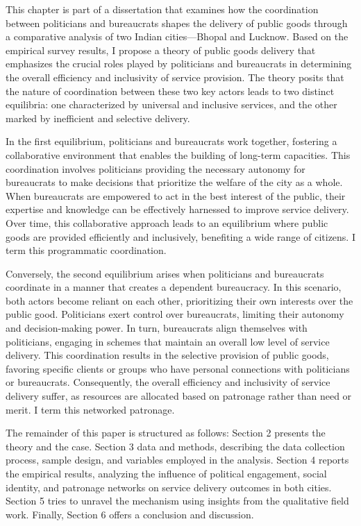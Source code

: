 This chapter is part of a dissertation that examines how the coordination between politicians and bureaucrats shapes the delivery of public goods through a comparative analysis of two Indian cities—Bhopal and Lucknow. Based on the empirical survey results, I propose a theory of public goods delivery that emphasizes the crucial roles played by politicians and bureaucrats in determining the overall efficiency and inclusivity of service provision. The theory posits that the nature of coordination between these two key actors leads to two distinct equilibria: one characterized by universal and inclusive services, and the other marked by inefficient and selective delivery.

In the first equilibrium, politicians and bureaucrats work together, fostering a collaborative environment that enables the building of long-term capacities. This coordination involves politicians providing the necessary autonomy for bureaucrats to make decisions that prioritize the welfare of the city as a whole. When bureaucrats are empowered to act in the best interest of the public, their expertise and knowledge can be effectively harnessed to improve service delivery. Over time, this collaborative approach leads to an equilibrium where public goods are provided efficiently and inclusively, benefiting a wide range of citizens. I term this programmatic coordination. 

Conversely, the second equilibrium arises when politicians and bureaucrats coordinate in a manner that creates a dependent bureaucracy. In this scenario, both actors become reliant on each other, prioritizing their own interests over the public good. Politicians exert control over bureaucrats, limiting their autonomy and decision-making power. In turn, bureaucrats align themselves with politicians, engaging in schemes that maintain an overall low level of service delivery. This coordination results in the selective provision of public goods, favoring specific clients or groups who have personal connections with politicians or bureaucrats. Consequently, the overall efficiency and inclusivity of service delivery suffer, as resources are allocated based on patronage rather than need or merit. I term this networked patronage. 

The remainder of this paper is structured as follows: Section 2 presents the theory and the case. Section 3 data and methods, describing the data collection process, sample design, and variables employed in the analysis. Section 4 reports the empirical results, analyzing the influence of political engagement, social identity, and patronage networks on service delivery outcomes in both cities. Section 5 tries to unravel the mechanism using insights from the qualitative field work. Finally, Section 6 offers a conclusion and discussion. 



